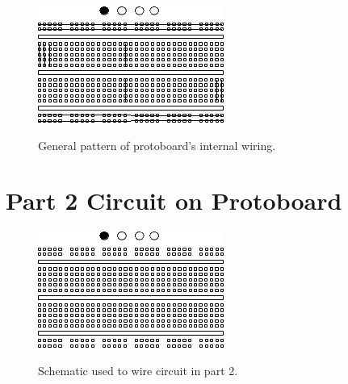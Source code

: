 \documentclass[twocolumn,english]{IEEEtran}
\theoremstyle{plain}
\theoremstyle{plain}
\begin{document}
\begin{figure}[h!]
  \begin{centering}
  \begin{center}
  \includegraphics[width=\linewidth]{./proto.png}
  \label{fig:proto}
  \caption{General pattern of protoboard's internal wiring.}
  \end{center}
  \par\end{centering}
  \end{figure}

\section{Part 2 Circuit on Protoboard}

\begin{figure}[h!]
  \begin{centering}
  \begin{center}
  \includegraphics[width=\linewidth]{./proto_2.png}
  \label{fig:proto2}
  \caption{Schematic used to wire circuit in part 2.}
  \end{center}
  \par\end{centering}
  \end{figure}

%
%
\end{document}
